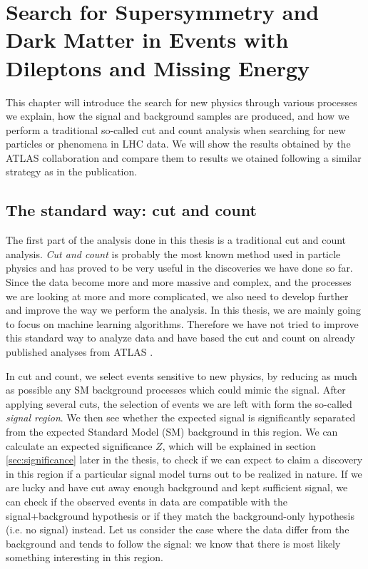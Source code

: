 \chapter{Search for Supersymmetry and Dark Matter in Events with Dileptons and Missing Energy}
\label{sec:CandCanalysis}


This chapter will introduce the search for new physics through various processes we explain, how the signal and background samples are produced, and how we perform a traditional so-called cut and count analysis when searching for new particles or phenomena in LHC data. We will show the results obtained by the ATLAS collaboration and compare them to results we otained following a similar strategy as in the publication. 




\section{The standard way: cut and count}
\label{sec:candc}

The first part of the analysis done in this thesis is a traditional cut and count analysis. \textit{Cut and count} is probably the most known method used in particle physics and has proved to be very useful in the discoveries we have done so far. Since the data become more and more massive and complex, and the processes we are looking at more and more complicated, we also need to develop further and improve the way we perform the analysis. In this thesis, we are mainly going to focus on machine learning algorithms. Therefore we have not tried to improve this standard way to analyze data and have based the cut and count on already published analyses from ATLAS \cite{sleptonexclusion, monoZexclusion}. 

In cut and count, we select events sensitive to new physics, by reducing as much as possible any SM background processes which could mimic the signal. After applying several cuts, the selection of events we are left with form the so-called \textit{signal region}. We then see whether the expected signal is significantly separated from the expected Standard Model (SM) background in this region. We can calculate an expected significance $Z$, which will be explained in section \ref{sec:significance} later in the thesis, to check if we can expect to claim a discovery in this region if a particular signal model turns out to be realized in nature. If we are lucky and have cut away enough background and kept sufficient signal, we can check if the observed events in data are compatible with the signal+background hypothesis or if they match the background-only hypothesis (i.e. no signal) instead. Let us consider the case where the data differ from the background and tends to follow the signal: we know that there is most likely something interesting in this region.


